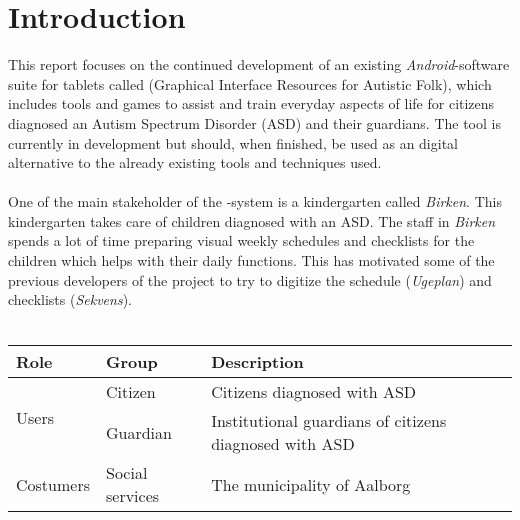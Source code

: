 \chapter{Introduction}
\label{cha:introduction}


This report focuses on the continued development of an existing \emph{Android}-software suite for tablets called \giraf (Graphical Interface Resources for Autistic Folk), which includes tools and games to assist and train everyday aspects of life for citizens diagnosed an Autism Spectrum Disorder (ASD) and their guardians. The tool is currently in development but should, when finished, be used as an digital alternative to the already existing tools and techniques used. 
\\\\
One of the main stakeholder of the \giraf-system is a kindergarten called \emph{Birken}. This kindergarten takes care of children diagnosed with an ASD. The staff in \emph{Birken} spends a lot of time preparing visual weekly schedules and checklists for the children which helps with their daily functions. This has motivated some of the previous developers of the \giraf project to try to digitize the schedule (\emph{Ugeplan}) and checklists (\emph{Sekvens}). 
\\\\

\begin{table}[!htbp]
    \begin{tabular}{|l|l|l|}
    \hline
    \textbf{Role}				& \textbf{Group}  & \textbf{Description}                                   \\ \hline
    \multirow{2}{*}{Users}      & Citizen         & Citizens diagnosed with ASD                            \\ \cline{2-3}
             					& Guardian        & Institutional guardians of citizens diagnosed with ASD \\ \hline
    Costumers 					& Social services & The municipality of Aalborg                            \\ \hline
    \end{tabular}
\end{table}



